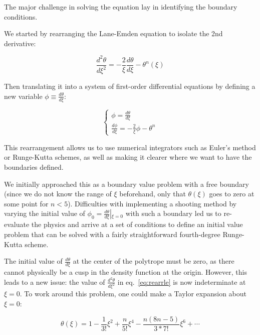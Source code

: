 \documentclass[twoside]{article}
\begin{document}
\begin{multicols}{2}
The major challenge in solving the equation lay in identifying the boundary
conditions. 

We started by rearranging the Lane-Emden equation to isolate the 2nd derivative:

\begin{equation}
    \label{eq:rearrle}
    \frac{d^2\theta}{d\xi^2}=-\frac{2}{\xi}\frac{d\theta}{d\xi}-\theta^n(\xi)
\end{equation}

Then translating it into a system of first-order differential equations by
defining a new variable \(\phi\equiv\frac{d\theta}{d\xi}\):

\begin{equation}
    \label{eq:sysle}
    \left\{\begin{array}{l}
        \phi = \frac{d\theta}{d\xi} \\
        \frac{d\phi}{d\xi} = -\frac{2}{\xi}\phi - \theta^n
    \end{array}\right.
\end{equation}

This rearrangement allows us to use numerical integrators such as Euler's method
or Runge-Kutta schemes, as well as making it clearer where we want to have the
boundaries defined.

We initially approached this as a boundary value problem with a free
boundary\cite[p.756]{nrinc} (since we do not know the range of \(\xi\)
beforehand, only that \(\theta(\xi)\) goes to zero at some point for \(n < 5\)).
Difficulties with implementing a shooting method\cite[pp.474--482]{gsnm} by
varying the initial value of \(\phi_0 =
\frac{d\theta}{d\xi}\left|_{\xi=0}\right.\) with such a boundary led us to
re-evaluate the physics and arrive at a set of conditions to define an initial
value problem that can be solved with a fairly straightforward fourth-degree
Runge-Kutta scheme\cite[pp.411--415]{gsnm}.

The initial value of \(\frac{d\theta}{d\xi}\) at the center of the polytrope
must be zero, as there cannot physically be a cusp in the density function at
the origin. However, this leads to a new issue: the value of
\(\frac{d^2\theta}{d\xi^2}\) in eq.~\ref{eq:rearrle} is now indeterminate at
\(\xi=0\). To work around this problem, one could make a Taylor expansion about
\(\xi=0\)\cite[p.339]{hansen2004}:

\begin{equation}
    \theta(\xi)=1-\frac{1}{3!}\xi^2+\frac{n}{5!}\xi^4-\frac{n(8n-5)}{3*7!}\xi^6+\dotsb
\end{equation}


\end{multicols}
\end{document}
